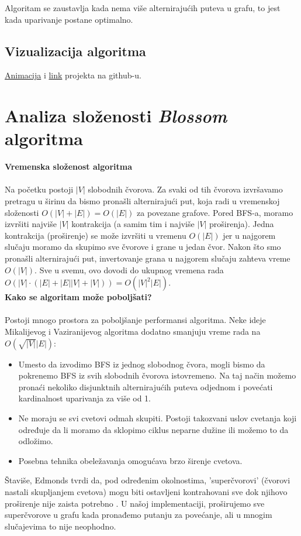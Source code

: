 \documentclass[11pt,a4paper]{article}
\theoremstyle{definition}
\begin{document}
Algoritam se zaustavlja kada nema više alternirajućih puteva u grafu, to jest kada uparivanje postane optimalno.

\subsection{Vizualizacija algoritma}
 \href{https://vimeo.com/927577879?fbclid=IwAR2BZosAPXiijL_bKGFEd95QWWcMh0Tdz8zW5eE52dDTUGJyfFTJhD0R6kc_aem_AcTke2drBvhw1lr_JueAdMddzb8covf0AeiVGffmFjbfZ_R8yk55H-Y6KBoQ98n4ckfnwsH-aqXiaPvwcyzxl3DU}{Animacija} i
 \href{https://github.com/MarijaBB/blossom-algorithm/}{link}
 projekta na github-u.
\newpage
\section{Analiza složenosti \textit{Blossom} algoritma}
\vspace{0.5cm}
\noindent\textbf{Vremenska složenost algoritma}\\ \\
Na početku postoji $|V|$ slobodnih čvorova. Za svaki od tih čvorova izvršavamo pretragu u širinu da bismo pronašli alternirajući put, koja radi u vremenskoj složenosti $O(|V|+|E|) = O(|E|)$ za povezane grafove. Pored BFS-a, moramo izvršiti najviše $|V|$ kontrakcija (a samim tim i najviše $|V|$ proširenja). Jedna kontrakcija (proširenje) se može izvršiti u vremenu $O(|E|)$ jer u najgorem slučaju moramo da skupimo sve čvorove i grane u jedan čvor. Nakon što smo pronašli alternirajući put, invertovanje grana u najgorem slučaju zahteva vreme $O(|V|)$. Sve u svemu, ovo dovodi do ukupnog vremena rada $O(|V| \cdot (|E|+|E||V|+|V|))=O(|V|^2|E|)$. \cite{sajt5}
\vspace{0.5cm}\\
\textbf{Kako se algoritam može poboljšati?} \\ \\
Postoji mnogo prostora za poboljšanje performansi algoritma. Neke ideje Mikalijevog i Vaziranijevog algoritma dodatno smanjuju vreme rada na $O(\sqrt{|V|}|E|)$:
\begin{itemize}
\item Umesto da izvodimo BFS iz jednog slobodnog čvora, mogli bismo da pokrenemo BFS iz svih slobodnih čvorova istovremeno. Na taj način možemo pronaći nekoliko disjunktnih alternirajućih puteva odjednom i povećati kardinalnost uparivanja za više od 1.
\item Ne moraju se svi cvetovi odmah skupiti. Postoji takozvani uslov cvetanja koji određuje da li moramo da sklopimo ciklus neparne dužine ili možemo to da odložimo.
\item Posebna tehnika obeležavanja omogućava brzo širenje cvetova.\cite{sajt5}
\end{itemize}
Štaviše, Edmonds tvrdi da, pod određenim okolnostima, 'superčvorovi' (čvorovi nastali skupljanjem cvetova) mogu biti ostavljeni kontrahovani sve dok njihovo proširenje nije zaista potrebno \cite{knjiga2}. U našoj implementaciji, proširujemo sve superčvorove u grafu kada pronađemo putanju za povećanje, ali u mnogim slučajevima to nije neophodno.
\end{document}
